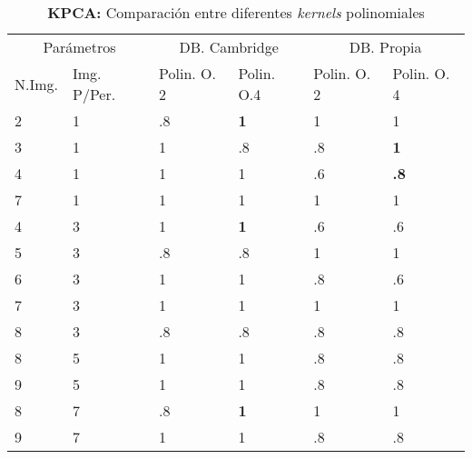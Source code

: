 \documentclass[12pt, twocolumn]{article}
\begin{document}
	
	\begin{table*}[]
		\centering
		\begin{tabular}{@{}ll|ll|ll@{}}
			\multicolumn{2}{c}{Parámetros} & \multicolumn{2}{c|}{DB. Cambridge}                & \multicolumn{2}{c}{DB. Propia}                    \\
			N.Img.      & Img. P/Per.      & \multicolumn{1}{l|}{Polin. O. 2} & Polin. O.4 & \multicolumn{1}{l|}{Polin. O. 2} & Polin. O. 4 \\ \midrule
			2           & 1                & .8                               & \textbf{1} & 1                                & 1           \\
			3           & 1                & 1                                & .8         & .8                               & \textbf{1}  \\
			4           & 1                & 1                                & 1          & .6                               & \textbf{.8} \\
			7           & 1                & 1                                & 1          & 1                                & 1           \\
			4           & 3                & 1                                & \textbf{1} & .6                               & .6          \\
			5           & 3                & .8                               & .8         & 1                                & 1           \\
			6           & 3                & 1                                & 1          & .8                               & .6    \\
			7           & 3                & 1                                & 1          & 1                                & 1           \\
			8           & 3                & .8                               & .8         & .8                               & .8          \\
			8           & 5                & 1                                & 1          & .8                               & .8          \\
			9           & 5                & 1                                & 1          & .8                               & .8          \\
			8           & 7                & .8                               & \textbf{1} & 1                                & 1           \\
			9           & 7                & 1                                & 1          & .8                               & .8         
		\end{tabular}
		\caption{\textbf{KPCA:} Comparación entre diferentes \textit{kernels} polinomiales}
		\label{kpca}
	\end{table*}
	
\end{document}

